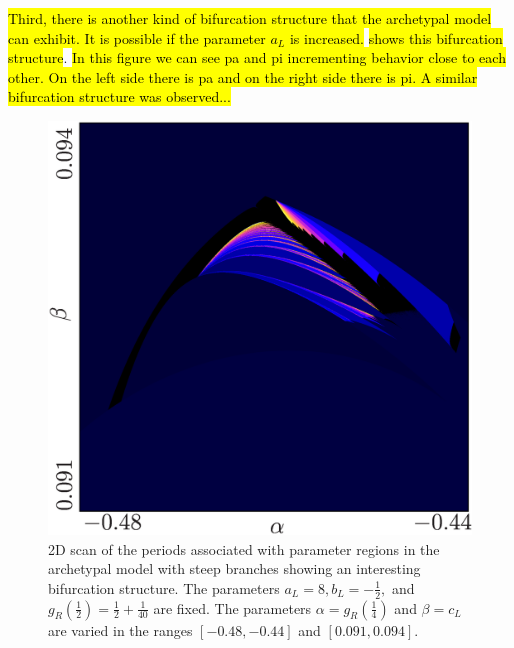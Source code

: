 \hl{
	Third, there is another kind of bifurcation structure that the archetypal model can exhibit.
	It is possible if the parameter $a_L$ is increased.
}
 \hl{shows this bifurcation structure}.
\hl{
	In this figure we can see \gls{pa} and \gls{pi} incrementing behavior close to each other.
	On the left side there is \gls{pa} and on the right side there is \gls{pi}.
	A similar bifurcation structure was observed...
}


\begin{figure}
	\centering
	\includegraphics[width=.7 \textwidth]{../Figures/8/8.1/result.png}
	\caption[2D scan of the periods associated with parameter regions in the archetypal model with steep branches showing an interesting bifurcation structure]{
		2D scan of the periods associated with parameter regions in the archetypal model with steep branches showing an interesting bifurcation structure.
		The parameters $a_L = 8, b_L = -\frac{1}{2},$ and $g_R\left(\frac{1}{2}\right) = \frac{1}{2} + \frac{1}{40}$ are fixed.
		The parameters $\alpha = g_R\left(\frac{1}{4}\right)$ and $\beta = c_L$ are varied in the ranges $[-0.48, -0.44]$ and $[0.091, 0.094]$.
	}
	\label{fig:concl.fut.addincr}
\end{figure}

